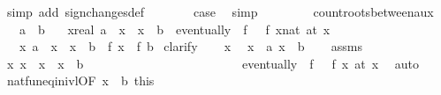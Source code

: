\begin{isabellebody}
\ {\isacharparenleft}simp\ add{\isacharcolon}\ sign{\isacharunderscore}changes{\isacharunderscore}def{\isacharparenright}\isanewline
\ \ \ \ \isamarkupfalse%
\ \isamarkupfalse%
\ {\isacharquery}case\ \isamarkupfalse%
\ simp\isanewline
\ \ \isamarkupfalse%
\isanewline
{}\isamarkupfalse%
%
\endisatagproof
{\isafoldproof}%
%
\isadelimproof
\isanewline
%
\endisadelimproof
\ \ \ \ \isanewline
\isanewline
{}\isamarkupfalse%
\ count{\isacharunderscore}roots{\isacharunderscore}between{\isacharunderscore}aux{\isacharcolon}\isanewline
\ \ \ {\isachardoublequoteopen}a\ {\isasymle}\ b{\isachardoublequoteclose}\isanewline
\ \ \ {\isachardoublequoteopen}{\isasymforall}x{\isacharcolon}{\isacharcolon}real{\isachardot}\ a\ {\isacharless}\ x\ {\isasymand}\ x\ {\isasymle}\ b\ {\isasymlongrightarrow}\ eventually\ {\isacharparenleft}{\isasymlambda}{\isasymxi}{\isachardot}\ f\ {\isasymxi}\ {\isacharequal}\ {\isacharparenleft}f\ x{\isacharcolon}{\isacharcolon}nat{\isacharparenright}{\isacharparenright}\ {\isacharparenleft}at\ x{\isacharparenright}{\isachardoublequoteclose}\isanewline
\ \ \ {\isachardoublequoteopen}{\isasymforall}x{\isachardot}\ a\ {\isacharless}\ x\ {\isasymand}\ x\ {\isasymle}\ b\ {\isasymlongrightarrow}\ f\ x\ {\isacharequal}\ f\ b{\isachardoublequoteclose}\isanewline
%
\isadelimproof
%
\endisadelimproof
%
\isatagproof
{}\isamarkupfalse%
\ {\isacharparenleft}clarify{\isacharparenright}\isanewline
\ \ \isamarkupfalse%
\ x\ \isamarkupfalse%
\ {\isachardoublequoteopen}x\ {\isachargreater}\ a{\isachardoublequoteclose}\ {\isachardoublequoteopen}x\ {\isasymle}\ b{\isachardoublequoteclose}\isanewline
\ \ \isamarkupfalse%
\ assms\ \isamarkupfalse%
\ {\isachardoublequoteopen}{\isasymforall}x{\isacharprime}{\isachardot}\ x\ {\isasymle}\ x{\isacharprime}\ {\isasymand}\ x{\isacharprime}\ {\isasymle}\ b\ {\isasymlongrightarrow}\ \isanewline
\ \ \ \ \ \ \ \ \ \ \ \ \ \ \ \ \ \ \ \ \ \ \ eventually\ {\isacharparenleft}{\isasymlambda}{\isasymxi}{\isachardot}\ f\ {\isasymxi}\ {\isacharequal}\ f\ x{\isacharprime}{\isacharparenright}\ {\isacharparenleft}at\ x{\isacharprime}{\isacharparenright}{\isachardoublequoteclose}\ \isamarkupfalse%
\ auto\isanewline
\ \ \isamarkupfalse%
\ natfun{\isacharunderscore}eq{\isacharunderscore}in{\isacharunderscore}ivl{\isacharbrackleft}OF\ {\isacharbackquoteopen}x\ {\isasymle}\ b{\isacharbackquoteclose}\ this{\isacharbrackright}\ \isamarkupfalse%

\end{isabellebody}
